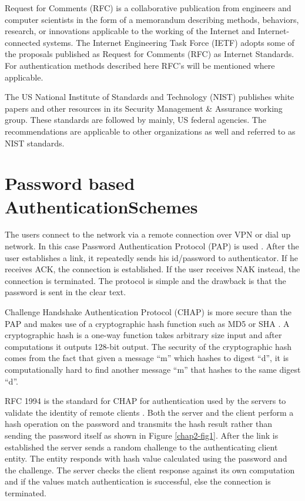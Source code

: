 \begin{multicols}{2}
Request for Comments (RFC) is a collaborative publication from engineers and computer scientists in the form of a memorandum describing methods, behaviors, research, or innovations applicable to the working of the Internet and Internet-connected systems. The Internet Engineering Task Force (IETF) adopts some of the proposals published as Request for Comments (RFC) as Internet Standards. For authentication methods described here RFC's will be mentioned where applicable.

The US National Institute of Standards and Technology (NIST) publishes white papers and other resources in its Security Management \& Assurance working group. These standards are followed by mainly, US federal agencies. The recommendations are applicable to other organizations as well and referred to as NIST standards.

\section*{Password based Authentication\hfill\break Schemes}

The users connect to the network via a remote connection over VPN or dial up network. In this case Password Authentication Protocol (PAP) is used \cite{chap2-key4}. After the user establishes a link, it repeatedly sends his id/password to authenticator. If he receives ACK, the connection is established. If the user receives NAK instead, the connection is terminated. The protocol is simple and the drawback is that the password is sent in the clear text.

Challenge Handshake Authentication Protocol (CHAP) is more secure than the PAP and makes use of a cryptographic hash function such as MD5 or SHA \cite{chap2-key1}. A cryptographic hash is a one-way function takes arbitrary size input and after computations it outputs 128-bit output. The security of the cryptographic hash comes from the fact that given a message ``m'' which hashes to digest ``d'', it is computationally hard to find another message ``m'' that hashes to the same digest ``d''.

RFC 1994 is the standard for CHAP for authentication used by the servers to validate the identity of remote clients \cite{chap2-key5}. Both the server and the client perform a hash operation on the password and transmits the hash result rather than sending the password itself as shown in Figure \ref{chap2-fig1}. After the link is established the server sends a random challenge to the authenticating client entity. The entity responds with hash value calculated using the password and the challenge. The server checks the client response against its own computation and if the values match authentication is successful, else the connection is terminated.


\end{multicols}
